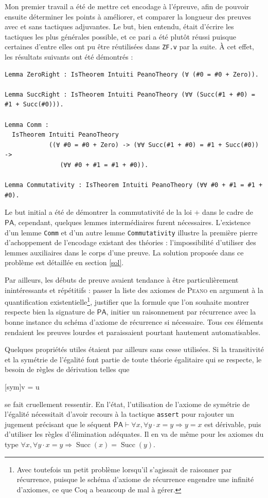 \documentclass[a4paper]{article}
\DeclareMathOperator{\Succ}{\mathrm{Succ}}
\newcommand{\PA}{\mathsf{PA}}
\theoremstyle{remark}
\theoremstyle{remark}
\theoremstyle{remark}
\theoremstyle{definition}
\theoremstyle{definition}
\theoremstyle{definition}
\begin{document}
Mon premier travail a été de mettre cet encodage à l'épreuve, afin de pouvoir ensuite déterminer les points à améliorer, et comparer la longueur des preuves avec et sans tactiques adjuvantes. Le but, bien entendu, était d'écrire les tactiques les plus générales possible, et ce pari a été plutôt réussi puisque certaines d'entre elles ont pu être réutilisées dans \verb+ZF.v+ par la suite. \`A cet effet, les résultats suivants ont été démontrés :
\begin{verbatim}
Lemma ZeroRight : IsTheorem Intuiti PeanoTheory (∀ (#0 = #0 + Zero)).

Lemma SuccRight : IsTheorem Intuiti PeanoTheory (∀∀ (Succ(#1 + #0) = #1 + Succ(#0))).

Lemma Comm :
  IsTheorem Intuiti PeanoTheory
            ((∀ #0 = #0 + Zero) -> (∀∀ Succ(#1 + #0) = #1 + Succ(#0)) ->
               (∀∀ #0 + #1 = #1 + #0)).

Lemma Commutativity : IsTheorem Intuiti PeanoTheory (∀∀ #0 + #1 = #1 + #0).
\end{verbatim}
Le but initial a été de démontrer la commutativité de la loi $+$ dans le cadre de $\PA$, cependant, quelques lemmes intermédiaires furent nécessaires. L'existence d'un lemme \verb+Comm+ et d'un autre lemme \verb+Commutativity+ illustre la première pierre d'achoppement de l'encodage existant des théories : l'impossibilité d'utiliser des lemmes auxiliaires dans le corps d'une preuve. La solution proposée dans ce problème est détaillée en section \ref{sol}.

Par ailleurs, les débuts de preuve avaient tendance à être particulièrement inintéressants et répétitifs : passer la liste des axiomes de \textsc{Peano} en argument à la quantification existentielle\footnote{Avec toutefois un petit problème lorsqu'il s'agissait de raisonner par récurrence, puisque le schéma d'axiome de récurrence engendre une infinité d'axiomes, ce que Coq a beaucoup de mal à gérer.}, justifier que la formule que l'on souhaite montrer respecte bien la signature de $\PA$, initier un raisonnement par récurrence avec la bonne instance du schéma d'axiome de récurrence si nécessaire. Tous ces éléments rendaient les preuves lourdes et paraissaient pourtant hautement automatisables.

Quelques propriétés utiles étaient par ailleurs sans cesse utilisées. Si la transitivité et la symétrie de l'égalité font partie de toute théorie égalitaire qui se respecte, le besoin de règles de dérivation telles que \begin{prooftree*}
[sym]{\Gamma \vdash v = u}
\end{prooftree*} se fait cruellement ressentir. En l'état, l'utilisation de l'axiome de symétrie de l'égalité nécessitait d'avoir recours à la tactique \verb+assert+ pour rajouter un jugement précisant que le séquent $\PA \vdash \forall x, \forall y \cdot x = y \Rightarrow y = x$ est dérivable, puis d'utiliser les règles d'élimination adéquates. Il en va de même pour les axiomes du type $\forall x, \forall y \cdot x = y \Rightarrow \Succ (x) = \Succ (y)$.
\end{document}
